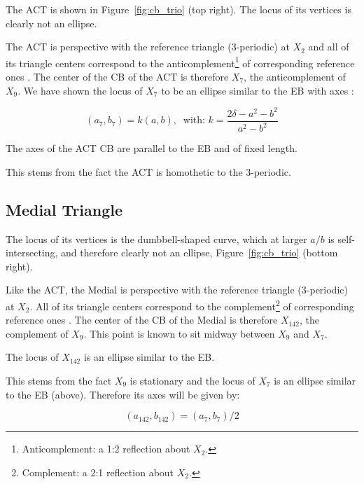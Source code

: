 The ACT is shown in Figure~\ref{fig:cb_trio} (top right). The locus of its vertices is clearly not an ellipse.

The ACT is perspective with the reference triangle (3-periodic) at $X_2$ and all of its triangle centers correspond to the anticomplement\footnote{Anticomplement: a 1:2 reflection about $X_2$.} of corresponding reference ones \cite{mw}. The center of the CB of the ACT is therefore $X_7$, the anticomplement of $X_9$. We have shown the locus of $X_7$ to be an ellipse similar to the EB with axes \cite{garcia2020-ellipses}:

\begin{equation*}
\left(a_7,b_7\right)=k\left(a,b\right),\;\;\text{with: }k=\frac{2\delta - {a}^{2}-{b}^{2}}{a^2-b^2}
\end{equation*}

\begin{remark}
The axes of the ACT CB are parallel to the EB and of fixed length.
\end{remark}

This stems from the fact the ACT is homothetic to the 3-periodic.

\subsection{Medial Triangle}

The locus of its vertices is the dumbbell-shaped curve, which at larger $a/b$ is self-intersecting, and therefore clearly not an ellipse, Figure~\ref{fig:cb_trio} (bottom right).

Like the ACT, the Medial is perspective with the reference triangle (3-periodic) at $X_2$. All of its triangle centers correspond to the complement\footnote{Complement: a 2:1 reflection about $X_2$.} of corresponding reference ones \cite{mw}. The center of the CB of the Medial is therefore $X_{142}$, the complement of $X_9$. This point is known to sit midway between $X_9$ and $X_7$.

\begin{remark}
The locus of $X_{142}$ is an ellipse similar to the EB.
\end{remark}

This stems from the fact $X_9$ is stationary and the locus of $X_7$ is an ellipse similar to the EB (above). Therefore its axes will be given by:

\begin{equation*}
\left(a_{142},b_{142}\right)=(a_7,b_7)/2
\end{equation*}


